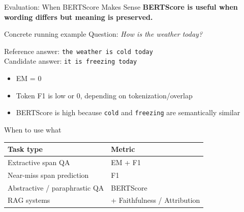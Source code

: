 \documentclass[aspectratio=169, xcolor=table]{beamer}
\newif\ifanimated
\newcommand{\cpause}{\ifanimated\pause\fi}
\begin{document}



\begin{frame}[shrink=10]{Evaluation: When BERTScore Makes Sense}
\textbf{BERTScore is useful when wording differs but meaning is preserved.}

\vspace{0.7em}
\begin{block}{Concrete running example}
Question: \emph{How is the weather today?}

\vspace{0.3em}
Reference answer: \texttt{the weather is cold today} \\
Candidate answer: \texttt{it is freezing today}

\vspace{0.5em}
\begin{itemize}
  \item EM = 0
  \item Token F1 is low or 0, depending on tokenization/overlap
  \item BERTScore is high because \texttt{cold} and \texttt{freezing} are semantically similar
\end{itemize}
\end{block}

\vspace{0.5em}
\cpause
\begin{block}{When to use what}
\begin{tabular}{l l}
Task type & Metric \\
\midrule
Extractive span QA & EM + F1 \\
Near-miss span prediction & F1 \\
Abstractive / paraphrastic QA & BERTScore \\
RAG systems & + Faithfulness / Attribution \\
\end{tabular}
\end{block}
\end{frame}
\end{document}
